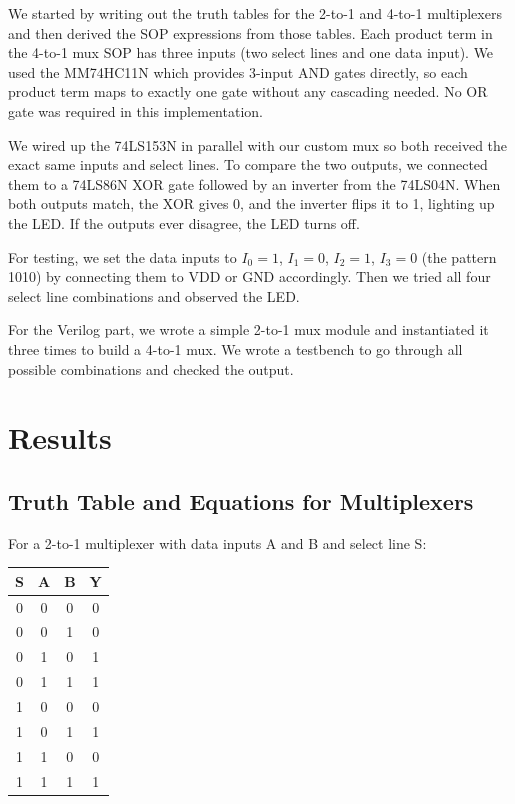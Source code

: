 \documentclass[12pt, letterpaper]{article}
\begin{document}
We started by writing out the truth tables for the 2-to-1 and 4-to-1 multiplexers and then derived the SOP expressions from those tables. Each product term in the 4-to-1 mux SOP has three inputs (two select lines and one data input). We used the MM74HC11N which provides 3-input AND gates directly, so each product term maps to exactly one gate without any cascading needed. No OR gate was required in this implementation.

We wired up the 74LS153N in parallel with our custom mux so both received the exact same inputs and select lines. To compare the two outputs, we connected them to a 74LS86N XOR gate followed by an inverter from the 74LS04N. When both outputs match, the XOR gives 0, and the inverter flips it to 1, lighting up the LED. If the outputs ever disagree, the LED turns off.

For testing, we set the data inputs to $I_0 = 1$, $I_1 = 0$, $I_2 = 1$, $I_3 = 0$ (the pattern 1010) by connecting them to VDD or GND accordingly. Then we tried all four select line combinations and observed the LED.

For the Verilog part, we wrote a simple 2-to-1 mux module and instantiated it three times to build a 4-to-1 mux. We wrote a testbench to go through all possible combinations and checked the output.

\section{Results}

\subsection{Truth Table and Equations for Multiplexers}

For a 2-to-1 multiplexer with data inputs A and B and select line S:

\begin{center}
  \begin{tabular}{|c|c|c|c|}
    \hline
    S & A & B & Y \\
    \hline
    0 & 0 & 0 & 0 \\
    0 & 0 & 1 & 0 \\
    0 & 1 & 0 & 1 \\
    0 & 1 & 1 & 1 \\
    1 & 0 & 0 & 0 \\
    1 & 0 & 1 & 1 \\
    1 & 1 & 0 & 0 \\
    1 & 1 & 1 & 1 \\
    \hline
  \end{tabular}
\end{center}
\end{document}
